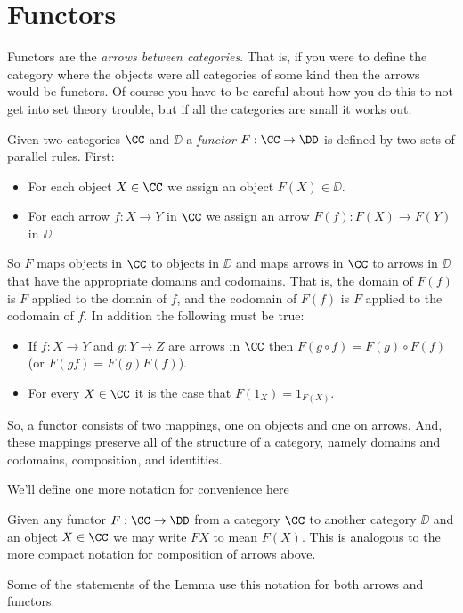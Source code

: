 \section{Functors}

Functors are the {\it arrows between categories}. That is, if you were to define the category where the objects were all categories of some kind then the arrows would be functors. Of course you have to be careful about how you do this to not get into set theory trouble, but if all the categories are small it works out.

\begin{defn}
Given two categories $\CC$ and $\DD$ a {\it functor} $F : \CC \to \DD$ is defined by two sets of parallel rules. First:
\begin{itemize}
\item For each object $X \in \CC$ we assign an object $F(X) \in \DD$.
\item For each arrow $f: X \to Y$ in $\CC$ we assign an arrow $F(f): F(X) \to F(Y)$ in $\DD$.
\end{itemize}
\noindent
So $F$ maps objects in $\CC$ to objects in $\DD$ and maps arrows in $\CC$ to arrows in $\DD$ that have the appropriate domains and codomains. That is, the domain of $F(f)$ is $F$ applied to the domain of $f$, and the codomain of $F(f)$ is $F$ applied to the codomain of $f$. In addition the following must be true:
\begin{itemize}
\item If $f:X \to Y$ and $g: Y \to Z$ are arrows in $\CC$ then $F(g \circ f) = F(g) \circ F(f)$ (or $F(gf) = F(g)F(f)$).
\item For every $X \in \CC$ it is the case that $F(1_X) = 1_{F(X)}$.
\end{itemize}

\end{defn}
\noindent
So, a functor consists of two mappings, one on objects and one on arrows. And, these mappings preserve all of the structure of a category, 
namely domains and codomains, composition, and identities.

We'll define one more notation for convenience here

\begin{defn}
Given any functor $F: \CC \to \DD$ from a category $\CC$ to another category $\DD$ and an object $X \in \CC$ we may write $F X$ to mean $F(X)$. This is analogous to the more compact notation for composition of arrows above.
\end{defn}
\noindent
Some of the statements of the Lemma use this notation for both arrows and functors.

